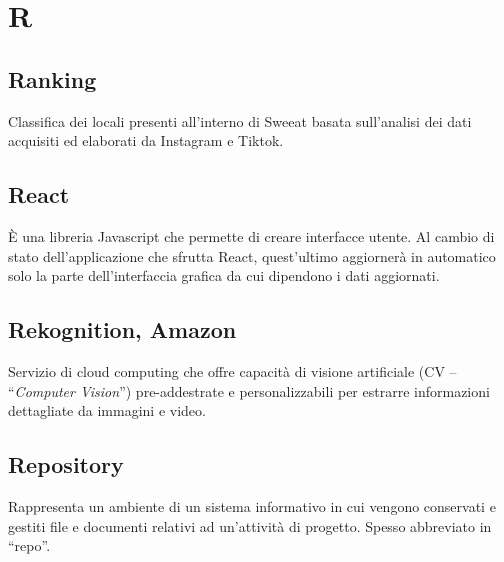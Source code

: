 \section{R}

\subsection{Ranking} Classifica dei locali presenti all’interno di Sweeat basata sull’analisi dei dati acquisiti ed elaborati da Instagram e Tiktok.

\subsection{React}
È una libreria Javascript che permette di creare interfacce utente. Al cambio di stato dell'applicazione che sfrutta React, quest'ultimo aggiornerà in automatico solo la parte dell'interfaccia grafica da cui dipendono i dati aggiornati.

\subsection{Rekognition, Amazon}
Servizio di cloud computing che offre capacità di visione artificiale (CV – “\textit{Computer Vision}”) pre-addestrate e personalizzabili per estrarre informazioni dettagliate da immagini e video. 

\subsection{Repository}
Rappresenta un ambiente di un sistema informativo in cui vengono conservati e gestiti file e documenti relativi ad un’attività di progetto. Spesso abbreviato in “repo”.

\clearpage